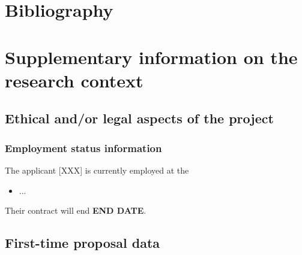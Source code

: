 \documentclass[a4paper,11pt]{article} %
\begin{document}
\section{Bibliography}

{\fontsize{9}{11}\selectfont %
}

\section{Supplementary information on the research context}

\subsection{Ethical and/or legal aspects of the project}

\subsubsection{Employment status information}

The applicant [XXX] is currently employed at the
\begin{itemize}
  \item ...
\end{itemize}
Their contract will end {\bf END DATE}.

\subsection{First-time proposal data}
\end{document}
